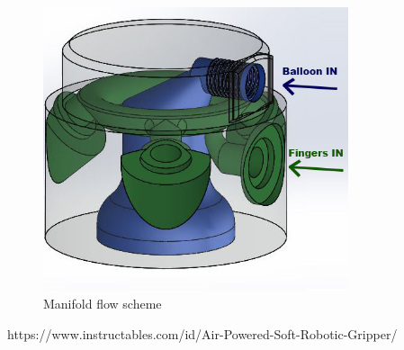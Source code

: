 \documentclass{article}
\begin{document}
\begin{figure}[h]
    \centering
    \includegraphics[width=0.8\textwidth]{Pictures/fingerOnToroidal/ManifoldSchemeFlowPhotoshop.jpg}
    \caption{Manifold flow scheme} 
    \label{fig:flowSchemeManifold}
\end{figure}




\begin{thebibliography}
 https://www.instructables.com/id/Air-Powered-Soft-Robotic-Gripper/
\end{thebibliography}
\end{document}
